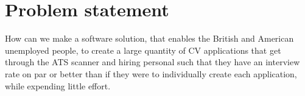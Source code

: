 \section{Problem statement}\label{sec:problem}
How can we make a software solution, 
that enables the British and American unemployed people,
 to create a large quantity of CV applications that get 
 through the ATS scanner and hiring personal such that they have an 
 interview rate on par or better than if they were to individually create 
 each application, while expending little effort.  